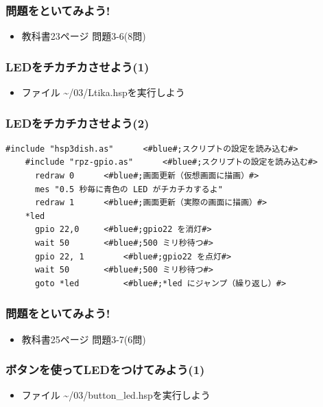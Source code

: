 \begin{frame}
  \frametitle{問題をといてみよう!}
  \begin{itemize}
    \item 教科書23ページ 問題3-6(8問)
  \end{itemize}
\end{frame}

\begin{frame}
  \frametitle{LEDをチカチカさせよう(1)}
  \begin{itemize}
    \item ファイル \rightarrow \sim/03/Ltika.hspを実行しよう
  \end{itemize}
\end{frame}

\begin{frame}[fragile]
  \frametitle{LEDをチカチカさせよう(2)}
  \begin{lstlisting}[title=\textasciitilde/03/Ltika.hsp,label=Ltika.hsp]
    #include "hsp3dish.as"		<#blue#;スクリプトの設定を読み込む#>
    #include "rpz-gpio.as"		<#blue#;スクリプトの設定を読み込む#>
      redraw 0		<#blue#;画面更新（仮想画面に描画）#>
      mes "0.5 秒毎に青色の LED がチカチカするよ"
      redraw 1		<#blue#;画面更新（実際の画面に描画）#>
    *led
      gpio 22,0		<#blue#;gpio22 を消灯#>
      wait 50 		<#blue#;500 ミリ秒待つ#>
      gpio 22, 1 		<#blue#;gpio22 を点灯#>
      wait 50 		<#blue#;500 ミリ秒待つ#>
      goto *led 		<#blue#;*led にジャンプ（繰り返し）#>
  \end{lstlisting}
\end{frame}

\begin{frame}
  \frametitle{問題をといてみよう!}
  \begin{itemize}
    \item 教科書25ページ 問題3-7(6問)
  \end{itemize}
\end{frame}

\begin{frame}
  \frametitle{ボタンを使ってLEDをつけてみよう(1)}
  \begin{itemize}
    \item ファイル \rightarrow \sim/03/button\_led.hspを実行しよう
  \end{itemize}
\end{frame}

